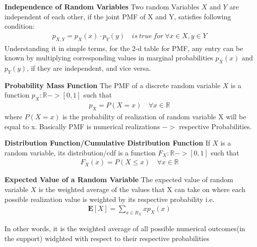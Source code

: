 \documentclass[10pt,a4paper]{article}
\newcommand{\R}{\mathbb{R}}
\begin{document}
	\begin{defn}{\textbf{Independence of Random Variables}}
		Two random Variables $X$ and $Y$ are independent of each other, if the joint PMF of X and Y,
		satisfies following condition:
		\begin{align}
			p_{X,Y} = p_X(x) \cdot p_Y(y) \quad is\ true\ for\  \forall x \in X, y \in Y
		\end{align}
		Understanding it in simple terms, for the 2-d table for PMF, any entry can be known by 
		multiplying corresponding values in marginal probabilities $p_X(x)$ and $p_Y(y)$, if they are independent, and vice versa.
	\end{defn}

	\begin{defn}{\textbf{Probability Mass Function}}
		The PMF of a discrete random variable $X$ is a function $p_X : \R -> [0,1]$ such that\\
		\begin{align}
			p_X = P(X = x)\quad \forall x \in \R
		\end{align}
		where $P(X = x)$ is the probability of realization of random variable X will be equal to x. Basically PMF is numerical realizations $->$ respective Probabilities.
	\end{defn}

	\begin{defn}{\textbf{Distribution Function/Cumulative Distribution Function}}
		If $X$ is a random variable, its distribution/cdf is a function $F_X : \R -> [0,1]$ such that \\
		\begin{align}
			F_X(x) = P(X \le x) \quad \forall x \in \R
		\end{align}
	\end{defn}

	\begin{defn}{\textbf{Expected Value of a Random Variable}}
	The expected value of random variable $X$ is the weighted average of the values that X can take on where each possible realization value is weighted by its respective probability i.e. \\
	\begin{align}
		\mathbf{E}[X] = \sum\limits_{x \in R_X}xp_X(x)
	\end{align}
	
	In other words, it is the weighted average of all possible numerical outcomes(in the support) widghted with respect to their respective probabilities
	\end{defn}
\end{document}
